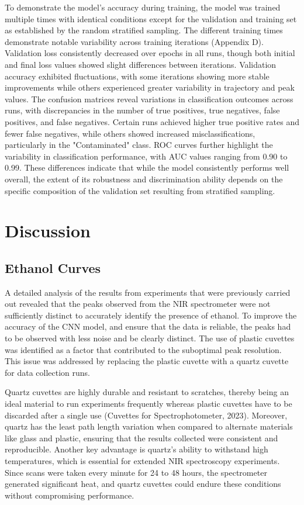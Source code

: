 \documentclass[12pt]{report}
\begin{document}
To demonstrate the model’s accuracy during training, the model was trained multiple times with identical conditions except for the validation and training set as established by the random stratified sampling. The different training times demonstrate notable variability across training iterations (Appendix D). Validation loss consistently decreased over epochs in all runs, though both initial and final loss values showed slight differences between iterations. Validation accuracy exhibited fluctuations, with some iterations showing more stable improvements while others experienced greater variability in trajectory and peak values. The confusion matrices reveal variations in classification outcomes across runs, with discrepancies in the number of true positives, true negatives, false positives, and false negatives. Certain runs achieved higher true positive rates and fewer false negatives, while others showed increased misclassifications, particularly in the "Contaminated" class. ROC curves further highlight the variability in classification performance, with AUC values ranging from 0.90 to 0.99. These differences indicate that while the model consistently performs well overall, the extent of its robustness and discrimination ability depends on the specific composition of the validation set resulting from stratified sampling.

\section{Discussion}

\subsection{Ethanol Curves}

A detailed analysis of the results from experiments that were previously carried out revealed that the peaks observed from the NIR spectrometer were not sufficiently distinct to accurately identify the presence of ethanol. To improve the accuracy of the CNN model, and ensure that the data is reliable, the peaks had to be observed with less noise and be clearly distinct. The use of plastic cuvettes was identified as a factor that contributed to the suboptimal peak resolution. This issue was addressed by replacing the plastic cuvette with a quartz cuvette for data collection runs. 

Quartz cuvettes are highly durable and resistant to scratches, thereby being an ideal material to run experiments frequently whereas plastic cuvettes have to be discarded after a single use (Cuvettes for Spectrophotometer, 2023). Moreover, quartz has the least path length variation when compared to alternate materials like glass and plastic, ensuring that the results collected were consistent and reproducible. Another key advantage is quartz’s ability to withstand high temperatures, which is essential for extended NIR spectroscopy experiments. Since scans were taken every minute for 24 to 48 hours, the spectrometer generated significant heat, and quartz cuvettes could endure these conditions without compromising performance.
\end{document}
